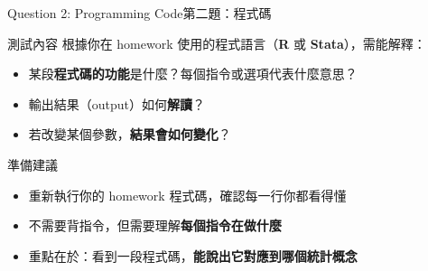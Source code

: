 \documentclass[dvipsnames,hyperref={pdfpagelabels=false}]{beamer}
\begin{document}
\begin{frame}{Question 2: Programming Code}{第二題：程式碼}

\begin{block}{測試內容}
	根據你在 homework 使用的程式語言（\textbf{R} 或 \textbf{Stata}），需能解釋：
	\begin{itemize}
		\vspace{0.1cm}
		\item 某段\textbf{程式碼的功能}是什麼？每個指令或選項代表什麼意思？
		\vspace{0.1cm}
		\item 輸出結果（output）如何\textbf{解讀}？
		\vspace{0.1cm}
		\item 若改變某個參數，\textbf{結果會如何變化}？
	\end{itemize}
\end{block}

\vspace{0.3cm}

\begin{exampleblock}{準備建議}
	\begin{itemize}
		\item 重新執行你的 homework 程式碼，確認每一行你都看得懂
		\vspace{0.1cm}
		\item 不需要背指令，但需要理解\textbf{每個指令在做什麼}
		\vspace{0.1cm}
		\item 重點在於：看到一段程式碼，\textbf{能說出它對應到哪個統計概念}
	\end{itemize}
\end{exampleblock}

\end{frame}
\end{document}
